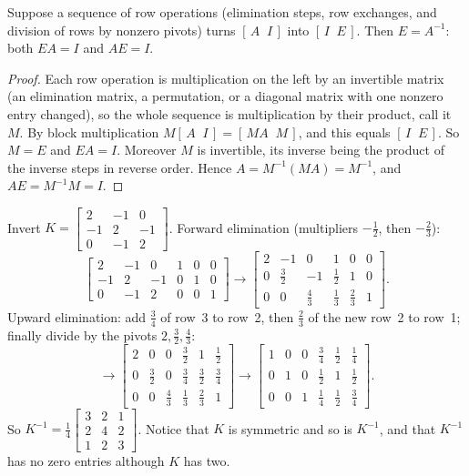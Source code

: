 \begin{theorem}\label{thm:u04-gj}
Suppose a sequence of row operations (elimination steps, row exchanges, and division of rows
by nonzero pivots) turns $[\,A\;\;I\,]$ into $[\,I\;\;E\,]$. Then $E=A^{-1}$: both $EA=I$
and $AE=I$.
\end{theorem}

\begin{proof}
Each row operation is multiplication on the left by an invertible matrix (an elimination
matrix, a permutation, or a diagonal matrix with one nonzero entry changed), so the whole
sequence is multiplication by their product, call it $M$. By block multiplication
$M[\,A\;\;I\,]=[\,MA\;\;M\,]$, and this equals $[\,I\;\;E\,]$. So $M=E$ and $EA=I$.
Moreover $M$ is invertible, its inverse being the product of the inverse steps in reverse
order. Hence $A=M^{-1}(MA)=M^{-1}$, and $AE=M^{-1}M=I$.
\end{proof}

\begin{example}\label{ex:u04-gj3}
Invert $K=\begin{bmatrix} 2 & -1 & 0\\ -1 & 2 & -1\\ 0 & -1 & 2\end{bmatrix}$. Forward
elimination (multipliers $-\tfrac12$, then $-\tfrac23$):
{\renewcommand{\arraystretch}{1.3}
\[
  \left[\begin{array}{rrr|rrr} 2&-1&0&1&0&0\\ -1&2&-1&0&1&0\\ 0&-1&2&0&0&1\end{array}\right]
  \to
  \left[\begin{array}{rrr|rrr} 2&-1&0&1&0&0\\ 0&\tfrac32&-1&\tfrac12&1&0\\ 0&0&\tfrac43&\tfrac13&\tfrac23&1\end{array}\right].
\]}%
Upward elimination: add $\tfrac34$ of row~3 to row~2, then $\tfrac23$ of the new row~2 to
row~1; finally divide by the pivots $2,\tfrac32,\tfrac43$:
{\renewcommand{\arraystretch}{1.3}
\[
  \to
  \left[\begin{array}{rrr|rrr} 2&0&0&\tfrac32&1&\tfrac12\\ 0&\tfrac32&0&\tfrac34&\tfrac32&\tfrac34\\ 0&0&\tfrac43&\tfrac13&\tfrac23&1\end{array}\right]
  \to
  \left[\begin{array}{rrr|rrr} 1&0&0&\tfrac34&\tfrac12&\tfrac14\\ 0&1&0&\tfrac12&1&\tfrac12\\ 0&0&1&\tfrac14&\tfrac12&\tfrac34\end{array}\right].
\]}%
So $K^{-1}=\frac14\begin{bmatrix} 3&2&1\\ 2&4&2\\ 1&2&3\end{bmatrix}$. Notice that $K$ is
symmetric and so is $K^{-1}$, and that $K^{-1}$ has no zero entries although $K$ has two.
\end{example}

